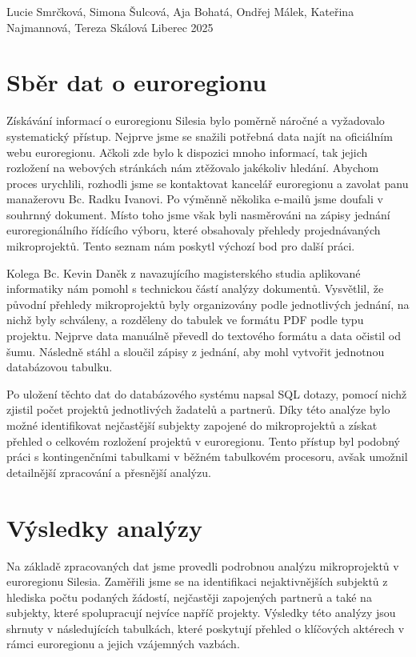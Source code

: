 \documentclass[a4paper,12pt,twoside,FP]{article}
\begin{document}
{Lucie Smrčková, Simona Šulcová, Aja Bohatá, Ondřej Málek, Kateřina Najmannová, Tereza Skálová}
{Liberec 2025}

\section*{Sběr dat o euroregionu}
Získávání informací o euroregionu Silesia bylo poměrně náročné a vyžadovalo systematický přístup. Nejprve jsme se snažili potřebná data najít na oficiálním webu euroregionu. Ačkoli zde bylo k dispozici mnoho informací, tak jejich rozložení na webových stránkách nám ztěžovalo jakékoliv hledání. Abychom proces urychlili, rozhodli jsme se kontaktovat kancelář euroregionu a zavolat panu manažerovu Bc. Radku Ivanovi. Po výměnně několika e-mailů jsme doufali v souhrnný dokument. Místo toho jsme však byli nasměrováni na zápisy jednání euroregionálního řídícího výboru, které obsahovaly přehledy projednávaných mikroprojektů. Tento seznam nám poskytl výchozí bod pro další práci.

Kolega Bc. Kevin Daněk z navazujícího magisterského studia aplikované informatiky nám pomohl s technickou částí analýzy dokumentů. Vysvětlil, že původní přehledy mikroprojektů byly organizovány podle jednotlivých jednání, na nichž byly schváleny, a rozděleny do tabulek ve formátu PDF podle typu projektu. Nejprve data manuálně převedl do textového formátu a data očistil od šumu. Následně stáhl a sloučil zápisy z jednání, aby mohl vytvořit jednotnou databázovou tabulku.

Po uložení těchto dat do databázového systému napsal SQL dotazy, pomocí nichž zjistil počet projektů jednotlivých žadatelů a partnerů. Díky této analýze bylo možné identifikovat nejčastější subjekty zapojené do mikroprojektů a získat přehled o celkovém rozložení projektů v euroregionu. Tento přístup byl podobný práci s kontingenčními tabulkami v běžném tabulkovém procesoru, avšak umožnil detailnější zpracování a přesnější analýzu.
\clearpage

\section*{Výsledky analýzy}
Na základě zpracovaných dat jsme provedli podrobnou analýzu mikroprojektů v euroregionu Silesia. Zaměřili jsme se na identifikaci nejaktivnějších subjektů z hlediska počtu podaných žádostí, nejčastěji zapojených partnerů a také na subjekty, které spolupracují nejvíce napříč projekty. Výsledky této analýzy jsou shrnuty v následujících tabulkách, které poskytují přehled o klíčových aktérech v rámci euroregionu a jejich vzájemných vazbách.
\end{document}
